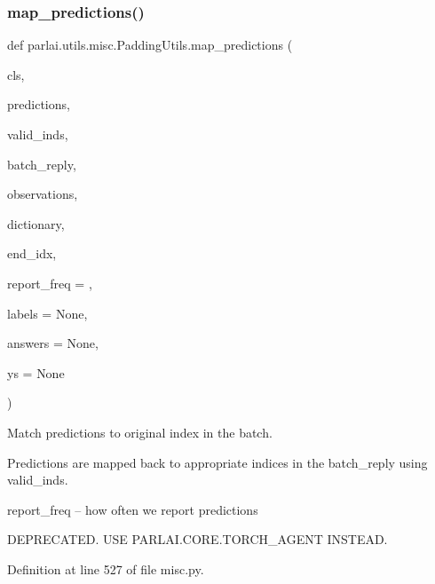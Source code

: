 \subsubsection{\texorpdfstring{map\+\_\+predictions()}{map\_predictions()}}
{\footnotesize\ttfamily def parlai.\+utils.\+misc.\+Padding\+Utils.\+map\+\_\+predictions (\begin{DoxyParamCaption}\item[{}]{cls,  }\item[{}]{predictions,  }\item[{}]{valid\+\_\+inds,  }\item[{}]{batch\+\_\+reply,  }\item[{}]{observations,  }\item[{}]{dictionary,  }\item[{}]{end\+\_\+idx,  }\item[{}]{report\+\_\+freq = {},  }\item[{}]{labels = {\ttfamily None},  }\item[{}]{answers = {\ttfamily None},  }\item[{}]{ys = {\ttfamily None} }\end{DoxyParamCaption})}

\begin{DoxyVerb}Match predictions to original index in the batch.

Predictions are mapped back to appropriate indices in the batch_reply
using valid_inds.

report_freq -- how often we report predictions

DEPRECATED. USE PARLAI.CORE.TORCH_AGENT INSTEAD.
\end{DoxyVerb}
 

Definition at line 527 of file misc.\+py.



